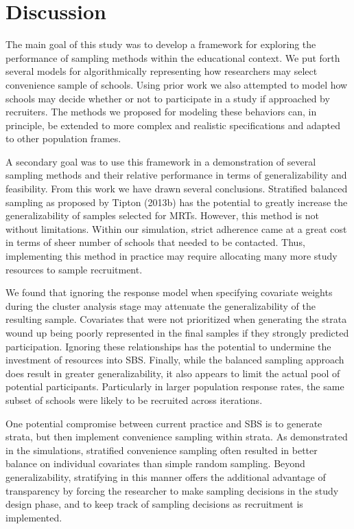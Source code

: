 \documentclass[man,floatsintext]{apa6}
\begin{document}
\hypertarget{discussion}{%
\section{Discussion}\label{discussion}}

The main goal of this study was to develop a framework for exploring the performance of sampling methods within the educational context. We put forth several models for algorithmically representing how researchers may select convenience sample of schools. Using prior work we also attempted to model how schools may decide whether or not to participate in a study if approached by recruiters. The methods we proposed for modeling these behaviors can, in principle, be extended to more complex and realistic specifications and adapted to other population frames.

A secondary goal was to use this framework in a demonstration of several sampling methods and their relative performance in terms of generalizability and feasibility. From this work we have drawn several conclusions. Stratified balanced sampling as proposed by Tipton (2013b) has the potential to greatly increase the generalizability of samples selected for MRTs. However, this method is not without limitations. Within our simulation, strict adherence came at a great cost in terms of sheer number of schools that needed to be contacted. Thus, implementing this method in practice may require allocating many more study resources to sample recruitment.

We found that ignoring the response model when specifying covariate weights during the cluster analysis stage may attenuate the generalizability of the resulting sample. Covariates that were not prioritized when generating the strata wound up being poorly represented in the final samples if they strongly predicted participation. Ignoring these relationships has the potential to undermine the investment of resources into SBS. Finally, while the balanced sampling approach does result in greater generalizability, it also appears to limit the actual pool of potential participants. Particularly in larger population response rates, the same subset of schools were likely to be recruited across iterations.

One potential compromise between current practice and SBS is to generate strata, but then implement convenience sampling within strata. As demonstrated in the simulations, stratified convenience sampling often resulted in better balance on individual covariates than simple random sampling. Beyond generalizability, stratifying in this manner offers the additional advantage of transparency by forcing the researcher to make sampling decisions in the study design phase, and to keep track of sampling decisions as recruitment is implemented.
\end{document}
